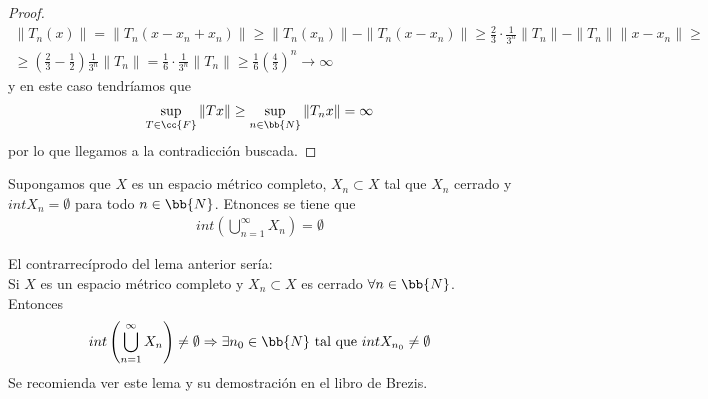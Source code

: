 \begin{prop}
\begin{proof}
\begin{gather*}
            \|T_n(x)\| = \| T_n(x-x_n+x_n)\| \geq \|T_n(x_n)\| - \|T_n(x-x_n)\| \geq \frac{2}{3} \cdot \frac{1}{3^n} \|T_n\| - \|T_n\|\|x - x_n\| \geq \\
            \geq \left(\frac{2}{3} - \frac{1}{2} \right) \frac{1}{3^n} \|T_n\| = \frac{1}{6} \cdot \frac{1}{3^n} \|T_n\| \geq \frac{1}{6}\left(\frac{4}{3}\right)^n \to \infty
        \end{gather*}
        y en este caso tendríamos que
        \begin{gather*}
            \sup_{T\in \cc{F}} \|Tx\| \geq \sup_{n\in \bb{N}} \|T_nx\| = \infty
        \end{gather*}
        por lo que llegamos a la contradicción buscada.
    \end{proof}
\end{prop}

\begin{lema} 
    Supongamos que $X$ es un espacio métrico completo, $X_n\subset X$ tal que $X_n$ cerrado y $int X_n = \emptyset$ para todo $n\in \bb{N}$. Etnonces se tiene que
    \begin{gather*}
        int \left(\bigcup\limits_{n=1}^\infty X_n\right) = \emptyset
    \end{gather*}
\end{lema}

\begin{observacion}
    El contrarrecíprodo del lema anterior sería:\\
    Si $X$ es un espacio métrico completo y $X_n\subset X$ es cerrado $\forall n\in \bb{N}$. Entonces
    \begin{gather*}
        int \left(\bigcup\limits_{n=1}^\infty X_n\right) \neq \emptyset \Rightarrow \exists n_0\in \bb{N} \text{ tal que } intX_{n_0}\neq \emptyset
    \end{gather*}
    Se recomienda ver este lema y su demostración en el libro de Brezis.
\end{observacion}








